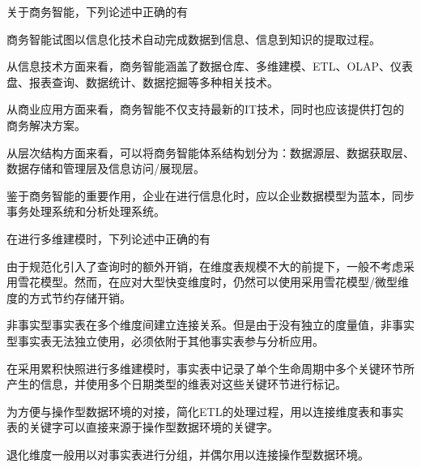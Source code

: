\begin{problem}
关于商务智能，下列论述中正确的有
\myline
\begin{compactenum}[A.]
    \item 商务智能试图以信息化技术自动完成数据到信息、信息到知识的提取过程。
    \item 从信息技术方面来看，商务智能涵盖了数据仓库、多维建模、ETL、OLAP、仪表盘、报表查询、数据统计、数据挖掘等多种相关技术。
    \item 从商业应用方面来看，商务智能不仅支持最新的IT技术，同时也应该提供打包的商务解决方案。
    \item 从层次结构方面来看，可以将商务智能体系结构划分为：数据源层、数据获取层、数据存储和管理层及信息访问/展现层。
    \item 鉴于商务智能的重要作用，企业在进行信息化时，应以企业数据模型为蓝本，同步事务处理系统和分析处理系统。
\end{compactenum}
\end{problem}


\begin{problem}
在进行多维建模时，下列论述中正确的有
\myline
\begin{compactenum}[A.]
    \item 由于规范化引入了查询时的额外开销，在维度表规模不大的前提下，一般不考虑采用雪花模型。然而，在应对大型快变维度时，仍然可以使用采用雪花模型/微型维度的方式节约存储开销。
    \item 非事实型事实表在多个维度间建立连接关系。但是由于没有独立的度量值，非事实型事实表无法独立使用，必须依附于其他事实表参与分析应用。
    \item 在采用累积快照进行多维建模时，事实表中记录了单个生命周期中多个关键环节所产生的信息，并使用多个日期类型的维表对这些关键环节进行标记。
    \item 为方便与操作型数据环境的对接，简化ETL的处理过程，用以连接维度表和事实表的关键字可以直接来源于操作型数据环境的关键字。
    \item 退化维度一般用以对事实表进行分组，并偶尔用以连接操作型数据环境。
\end{compactenum}
\end{problem}


